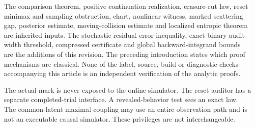 The comparison theorem, positive continuation realization, erasure-cut law,
reset minimax and sampling obstruction, chart, nonlinear witness, marked
scattering gap, posterior estimate, moving-collision estimate and localized
entropic theorem are inherited inputs. The stochastic residual error
inequality, exact binary audit-width threshold, compressed certificate and
global backward-integrand bounds are the additions of this revision.
The preceding introduction states which proof mechanisms are classical.
None of the label, source, build or diagnostic checks accompanying this
article is an independent verification of the analytic proofs.

The actual mark is never exposed to the online simulator. The reset auditor
has a separate completed-trial interface. A revealed-behavior test sees an
exact law. The common-latent maximal coupling may use an entire observation
path and is not an executable causal simulator. These privileges are not
interchangeable.


